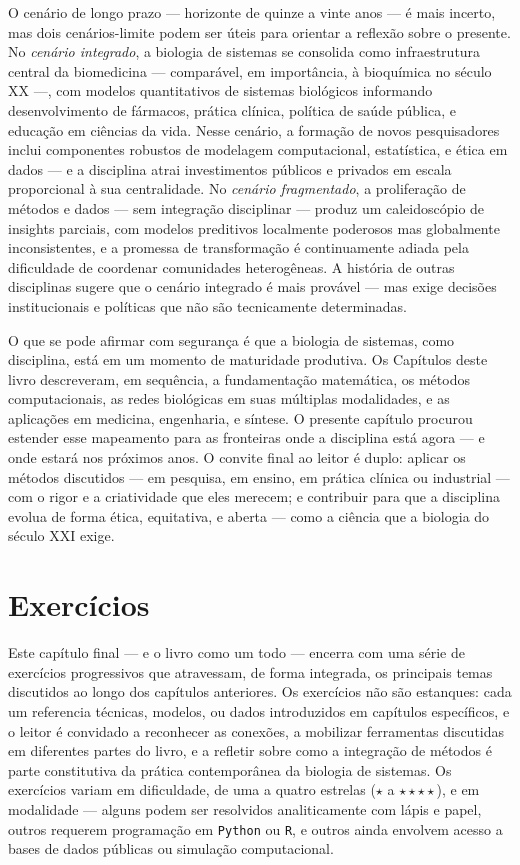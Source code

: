 O cenário de longo prazo --- horizonte de quinze a vinte anos --- é mais incerto, mas dois cenários-limite podem ser úteis para orientar a reflexão sobre o presente. No \emph{cenário integrado}, a biologia de sistemas se consolida como infraestrutura central da biomedicina --- comparável, em importância, à bioquímica no século XX ---, com modelos quantitativos de sistemas biológicos informando desenvolvimento de fármacos, prática clínica, política de saúde pública, e educação em ciências da vida. Nesse cenário, a formação de novos pesquisadores inclui componentes robustos de modelagem computacional, estatística, e ética em dados --- e a disciplina atrai investimentos públicos e privados em escala proporcional à sua centralidade. No \emph{cenário fragmentado}, a proliferação de métodos e dados --- sem integração disciplinar --- produz um caleidoscópio de insights parciais, com modelos preditivos localmente poderosos mas globalmente inconsistentes, e a promessa de transformação é continuamente adiada pela dificuldade de coordenar comunidades heterogêneas. A história de outras disciplinas sugere que o cenário integrado é mais provável --- mas exige decisões institucionais e políticas que não são tecnicamente determinadas.

O que se pode afirmar com segurança é que a biologia de sistemas, como disciplina, está em um momento de maturidade produtiva. Os Capítulos deste livro descreveram, em sequência, a fundamentação matemática, os métodos computacionais, as redes biológicas em suas múltiplas modalidades, e as aplicações em medicina, engenharia, e síntese. O presente capítulo procurou estender esse mapeamento para as fronteiras onde a disciplina está agora --- e onde estará nos próximos anos. O convite final ao leitor é duplo: aplicar os métodos discutidos --- em pesquisa, em ensino, em prática clínica ou industrial --- com o rigor e a criatividade que eles merecem; e contribuir para que a disciplina evolua de forma ética, equitativa, e aberta --- como a ciência que a biologia do século XXI exige.


\section{Exercícios}
\label{sec:15-exercicios}

Este capítulo final --- e o livro como um todo --- encerra com uma série de exercícios progressivos que atravessam, de forma integrada, os principais temas discutidos ao longo dos capítulos anteriores. Os exercícios não são estanques: cada um referencia técnicas, modelos, ou dados introduzidos em capítulos específicos, e o leitor é convidado a reconhecer as conexões, a mobilizar ferramentas discutidas em diferentes partes do livro, e a refletir sobre como a integração de métodos é parte constitutiva da prática contemporânea da biologia de sistemas. Os exercícios variam em dificuldade, de uma a quatro estrelas (\(\star\) a \(\star\star\star\star\)), e em modalidade --- alguns podem ser resolvidos analiticamente com lápis e papel, outros requerem programação em \texttt{Python} ou \texttt{R}, e outros ainda envolvem acesso a bases de dados públicas ou simulação computacional.

